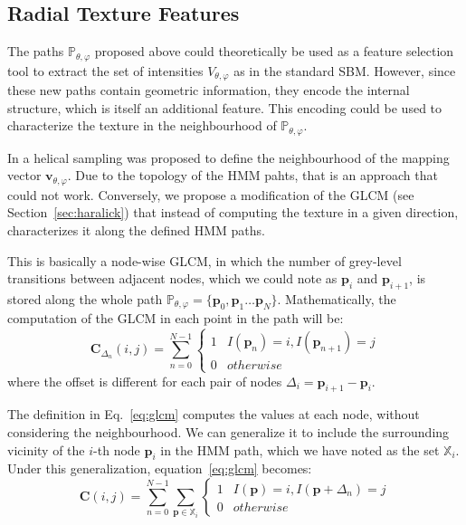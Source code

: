 \subsection{Radial Texture Features}\label{sec:rtextfeat}
The paths $\mathbb{P}_{\theta,\varphi}$ proposed above could theoretically be used as a feature selection tool to extract the set of intensities $V_{\theta,\varphi}$ as in the standard \ac{SBM}. However, since these new paths contain geometric information, they encode the internal structure, which is itself an additional feature. This encoding could be used to characterize the texture in the neighbourhood of $\mathbb{P}_{\theta,\varphi}$. 

In \cite{Martinez-MurciaVRLBP} a helical sampling was proposed to define the neighbourhood of the mapping vector $\mathbf{v}_{\theta,\varphi}$. Due to the topology of the \ac{HMM} pahts, that is an approach that could not work. Conversely, we propose a modification of the \ac{GLCM} (see Section~\ref{sec:haralick}) that instead of computing the texture in a given direction, characterizes it along the defined \ac{HMM} paths. 

This is basically a node-wise \ac{GLCM}, in which the number of grey-level transitions between adjacent nodes, which we could note as $\mathbf{p}_i$ and $\mathbf{p}_{i+1}$, is stored along the whole path $\mathbb{P}_{\theta,\varphi} = \{\mathbf{p}_0, \mathbf{p}_1 \dots \mathbf{p}_N\}$. Mathematically, the computation of the GLCM in each point in the path will be: 
\begin{equation}\label{eq:glcm}
\mathbf{C}_{\Delta_n}(i,j) = \sum_{n=0}^{N-1}
\begin{cases}
1 & I(\mathbf{p}_n) = i, I(\mathbf{p}_{n+1})=j\\
0 & otherwise
\end{cases}
\end{equation}
where the offset is different for each pair of nodes $\Delta_i=\mathbf{p}_{i+1}-\mathbf{p}_i$. 

The definition in Eq.~\ref{eq:glcm} computes the values at each node, without considering the neighbourhood. We can generalize it to include the surrounding vicinity of the $i$-th node $\mathbf{p}_i$ in the \ac{HMM} path, which we have noted as the set $\mathbb{X}_i$. Under this generalization, equation~\ref{eq:glcm} becomes: 
\begin{equation}\label{eq:glcmGen}
\mathbf{C}(i,j) = \sum_{n=0}^{N-1} \sum_{\mathbf{p} \in \mathbb{X}_i}
\begin{cases}
1 & I(\mathbf{p}) = i, I(\mathbf{p}+\Delta_n)=j\\
0 & otherwise
\end{cases}
\end{equation}

